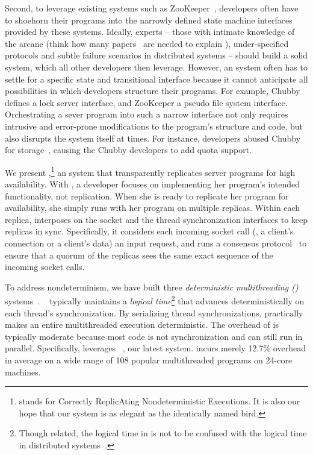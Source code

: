 Second, to leverage existing \smr systems such as
ZooKeeper~\cite{zookeeper}, developers often have to shoehorn their
programs into the narrowly defined state machine interfaces provided by
these \smr systems.  Ideally, experts -- those with intimate knowledge of
the arcane (think how many 
papers~\cite{paxos,paxos:simple,paxos:complex,paxos:live,paxos:practical} are 
needed to explain \paxos),
under-specified~\cite{paxos:practical} \smr protocols and subtle failure
scenarios in distributed systems -- should build a solid \smr system,
which all other developers then leverage. However, an \smr system often
has to settle for a specific state and transitional interface because it
cannot anticipate all possibilities in which developers structure their
programs.  For example, Chubby~\cite{chubby:osdi} defines a lock server
interface, and ZooKeeper a pseudo file system interface.  Orchestrating a
sever program into such a narrow interface not only requires
intrusive and error-prone modifications to the program's structure and
code, but also disrupts the \smr system itself at times. For instance,
developers abused Chubby for storage~\cite{chubby:osdi}, causing the
Chubby developers to add quota support.

We present \xxx,\footnote{\xxx stands for Correctly ReplicAting
  Nondeterministic Executions. It is also our hope that our system is as
  elegant as the identically named bird.} an \smr system that
transparently replicates server programs for high availability.  With
\xxx, a developer focuses on implementing her program's intended
functionality, not replication.  When she is ready to replicate her
program for availability, she simply runs \xxx with her program on
multiple replicas.  Within each replica, \xxx interposes on the socket and
the thread synchronization interfaces to keep replicas in sync.
Specifically, it considers each incoming socket call (\eg, \accept a
client's connection or \recv a client's data) an input request, and
runs a \paxos consensus protocol~\cite{paxos:practical} to ensure that a
quorum of the replicas sees the same exact sequence of the incoming socket calls.


To address nondeterminism, we have built three \emph{deterministic 
multithreading (\dmt)} systems~\cite{cui:tern:osdi10, peregrine:sosp11, 
parrot:sosp13}. \dmt~\cite{dpj:oopsla09,dmp:asplos09,kendo:asplos09,
coredet:asplos10, 
dos:osdi10,ddos:asplos13,ics:oopsla13} typically maintains a \emph{logical 
time}\footnote{Though related, the logical time in \dmt is not to 
be confused with the logical time in distributed systems~\cite{lamportclock}.} 
that advances deterministically on each thread's synchronization. By 
serializing thread synchronizations, \dmt practically makes an entire 
multithreaded execution deterministic. The overhead of \dmt is typically 
moderate because most code is not synchronization and can still run in parallel. 
Specifically, \xxx leverages \parrot~\cite{parrot:sosp13}, our latest \dmt 
system. \parrot incurs merely 12.7\% overhead in 
average on a wide range of 108 popular multithreaded programs on 24-core 
machines.

